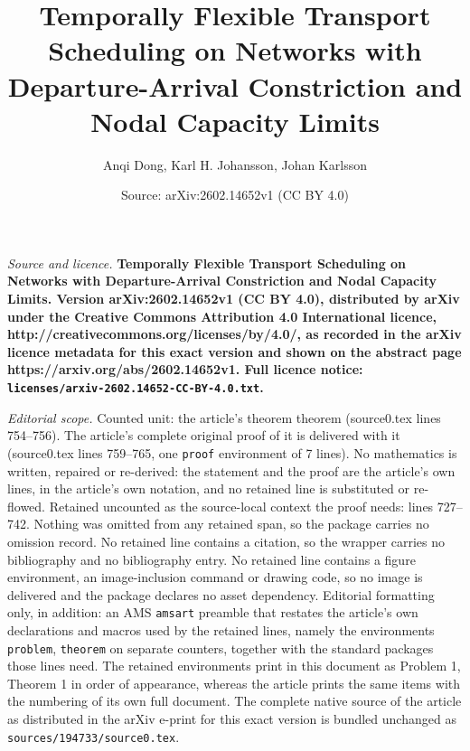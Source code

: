 \documentclass[10pt,a4paper]{amsart}
\title{\Large \bfseries Temporally Flexible Transport Scheduling on Networks with Departure-Arrival Constriction and Nodal Capacity Limits}
\author{Anqi Dong, Karl H. Johansson, Johan Karlsson}
\date{Source: arXiv:2602.14652v1 (CC BY 4.0)}
\begin{document}
\maketitle

\noindent\emph{Source and licence.} \Large \bfseries Temporally Flexible Transport Scheduling on Networks with Departure-Arrival Constriction and Nodal Capacity Limits. Version arXiv:2602.14652v1 (CC BY 4.0), distributed by arXiv under the Creative Commons Attribution 4.0 International licence, http://creativecommons.org/licenses/by/4.0/, as recorded in the arXiv licence metadata for this exact version and shown on the abstract page https://arxiv.org/abs/2602.14652v1. Full licence notice: \texttt{licenses/arxiv-2602.14652-CC-BY-4.0.txt}.\par\smallskip

\noindent\textit{Editorial scope.} Counted unit: the article's theorem theorem (source0.tex lines 754--756). The article's complete original proof of it is delivered with it (source0.tex lines 759--765, one \texttt{proof} environment of 7 lines). No mathematics is written, repaired or re-derived: the statement and the proof are the article's own lines, in the article's own notation, and no retained line is substituted or re-flowed.  Retained uncounted as the source-local context the proof needs: lines 727--742.  Nothing was omitted from any retained span, so the package carries no omission record.  No retained line contains a citation, so the wrapper carries no bibliography and no bibliography entry.  No retained line contains a figure environment, an image-inclusion command or drawing code, so no image is delivered and the package declares no asset dependency.  Editorial formatting only, in addition: an AMS \texttt{amsart} preamble that restates the article's own declarations and macros used by the retained lines, namely the environments \texttt{problem}, \texttt{theorem} on separate counters, together with the standard packages those lines need.  The retained environments print in this document as Problem 1, Theorem 1 in order of appearance, whereas the article prints the same items with the numbering of its own full document.  The complete native source of the article as distributed in the arXiv e-print for this exact version is bundled unchanged as \texttt{sources/194733/source0.tex}.
\end{document}
